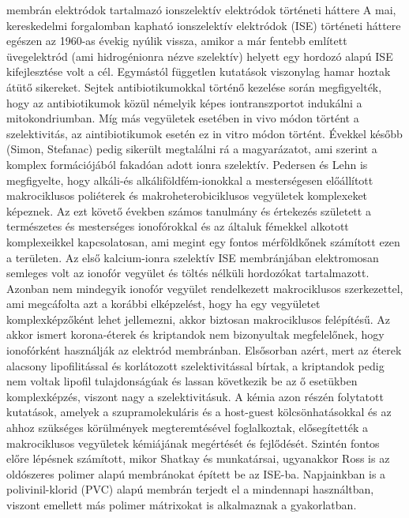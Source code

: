 { 
 membrán elektródok
 tartalmazó ionszelektív elektródok történeti háttere 
A mai, kereskedelmi forgalomban kapható ionszelektív elektródok (ISE) történeti háttere egészen az 1960-as évekig nyúlik vissza, amikor a már fentebb említett üvegelektród (ami hidrogénionra nézve szelektív) helyett egy hordozó alapú ISE kifejlesztése volt a cél. Egymástól független kutatások viszonylag hamar hoztak átütő sikereket. Sejtek antibiotikumokkal történő kezelése során megfigyelték, hogy az antibiotikumok közül némelyik képes iontranszportot indukálni a mitokondriumban. Míg más vegyületek esetében in vivo módon történt a szelektivitás, az aintibiotikumok esetén ez in vitro módon történt.  Évekkel később (Simon, Stefanac) pedig sikerült megtalálni rá a magyarázatot, ami szerint a komplex formációjából fakadóan adott ionra szelektív. Pedersen és Lehn is megfigyelte, hogy alkáli-és alkáliföldfém-ionokkal a mesterségesen előállított makrociklusos poliéterek és makroheterobiciklusos vegyületek komplexeket képeznek.  Az ezt követő években számos tanulmány és értekezés született a természetes és mesterséges ionofórokkal és az általuk fémekkel alkotott komplexeikkel kapcsolatosan, ami megint egy fontos mérföldkőnek számított ezen a területen.  Az első kalcium-ionra szelektív ISE membránjában elektromosan semleges volt az ionofór vegyület és töltés nélküli hordozókat tartalmazott. Azonban nem mindegyik ionofór vegyület rendelkezett makrociklusos szerkezettel, ami megcáfolta azt a korábbi elképzelést, hogy ha egy vegyületet komplexképzőként lehet jellemezni, akkor biztosan makrociklusos felépítésű. Az akkor ismert korona-éterek és kriptandok nem bizonyultak megfelelőnek, hogy ionofórként használják az elektród membránban. Elsősorban azért, mert az éterek alacsony lipofilitással és korlátozott szelektivitással bírtak, a kriptandok pedig nem voltak lipofil tulajdonságúak és lassan következik be az ő esetükben komplexképzés, viszont nagy a szelektivitásuk.  A kémia azon részén folytatott kutatások, amelyek a szupramolekuláris és a host-guest kölcsönhatásokkal és az ahhoz szükséges körülmények megteremtésével foglalkoztak, elősegítették a makrociklusos vegyületek kémiájának megértését és fejlődését. Szintén fontos előre lépésnek számított, mikor Shatkay és munkatársai, ugyanakkor Ross is az oldószeres polimer alapú membránokat épített be az ISE-ba. Napjainkban is a polivinil-klorid (PVC) alapú membrán terjedt el a mindennapi használtban, viszont emellett más polimer mátrixokat is alkalmaznak a gyakorlatban. 

}
